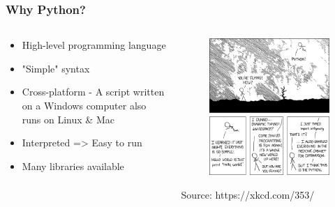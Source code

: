 \documentclass[10pt, a4paper]{beamer} %
\begin{document}
\begin{frame}[c]\frametitle{Why Python?}
  \begin{columns}
    \begin{column}{0.5\textwidth}
      \begin{itemize}
        \item High-level programming language
        \item "Simple" syntax
        \item Cross-platform - A script written on a Windows computer also runs on Linux \& Mac
        \item Interpreted => Easy to run
        \item Many libraries available
      \end{itemize}
    \end{column}
    \begin{column}{0.5\textwidth}  %
      \begin{figure}
        \includegraphics[width=0.9\linewidth]{pics/python.png}
      \end{figure}
      \tiny Source: https://xkcd.com/353/
    \end{column}
  \end{columns}

\end{frame}
\end{document}
